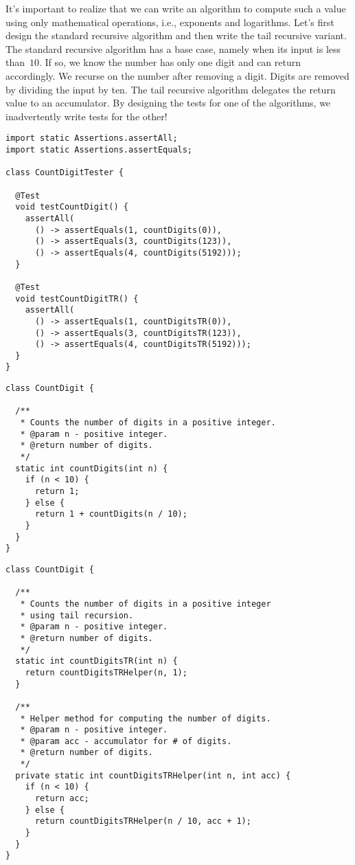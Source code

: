 It's important to realize that we can write an algorithm to compute such a value using only mathematical operations, i.e., exponents and logarithms.
Let's first design the standard recursive algorithm and then write the tail recursive variant.
The standard recursive algorithm has a base case, namely when its input is less than~$10$. If so, we know the number has only one digit and can return accordingly.
We recurse on the number after removing a digit.
Digits are removed by dividing the input by ten.
The tail recursive algorithm delegates the return value to an accumulator.
By designing the tests for one of the algorithms, we inadvertently write tests for the other!

\enlargethispage{-2\baselineskip}
\begin{lstlisting}[language=MyJava]
import static Assertions.assertAll;
import static Assertions.assertEquals;

class CountDigitTester {

  @Test
  void testCountDigit() {
    assertAll(
      () -> assertEquals(1, countDigits(0)),
      () -> assertEquals(3, countDigits(123)),
      () -> assertEquals(4, countDigits(5192)));
  }

  @Test
  void testCountDigitTR() {
    assertAll(
      () -> assertEquals(1, countDigitsTR(0)),
      () -> assertEquals(3, countDigitsTR(123)),
      () -> assertEquals(4, countDigitsTR(5192)));
  }
}
\end{lstlisting}

\begin{lstlisting}[language=MyJava]
class CountDigit {

  /**
   * Counts the number of digits in a positive integer.
   * @param n - positive integer.
   * @return number of digits.
   */
  static int countDigits(int n) {
    if (n < 10) {
      return 1;
    } else {
      return 1 + countDigits(n / 10);
    }
  }
}
\end{lstlisting}

\begin{lstlisting}[language=MyJava]
class CountDigit {

  /**
   * Counts the number of digits in a positive integer
   * using tail recursion.
   * @param n - positive integer.
   * @return number of digits.
   */
  static int countDigitsTR(int n) {
    return countDigitsTRHelper(n, 1);
  }

  /**
   * Helper method for computing the number of digits.
   * @param n - positive integer.
   * @param acc - accumulator for # of digits.
   * @return number of digits.
   */
  private static int countDigitsTRHelper(int n, int acc) {
    if (n < 10) {
      return acc;
    } else {
      return countDigitsTRHelper(n / 10, acc + 1);
    }
  }
}
\end{lstlisting}

